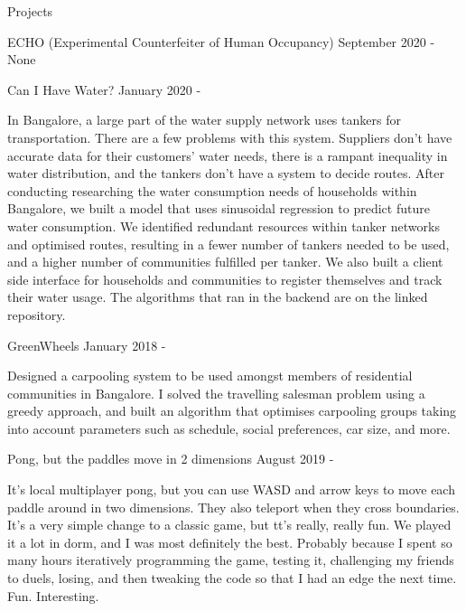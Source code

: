\documentclass{resume} %
\begin{document}
\begin{rSection}{Projects}
\begin{rSubsection}{ ECHO (Experimental Counterfeiter of Human Occupancy) }{ September 2020 - None }{}
\end{rSubsection}



\begin{rSubsection}{ Can I Have Water? }{ January 2020 -  }{}
\item In Bangalore, a large part of the water supply network uses tankers for transportation. There are a few problems with this system. Suppliers don’t have accurate data for their customers’ water needs, there is a rampant inequality in water distribution, and the tankers don't have a system to decide routes. After conducting researching the water consumption needs of households within Bangalore, we built a model that uses sinusoidal regression to predict future water consumption. We identified redundant resources within tanker networks and optimised routes, resulting in a fewer number of tankers needed to be used, and a higher number of communities fulfilled per tanker. We also built a client side interface for households and communities to register themselves and track their water usage. The algorithms that ran in the backend are on the linked repository.

\end{rSubsection}



\begin{rSubsection}{ GreenWheels }{ January 2018 -  }{}
\item Designed a carpooling system to be used amongst members of residential communities in Bangalore. I solved the travelling salesman problem using a greedy approach, and built an algorithm that optimises carpooling groups taking into account parameters such as schedule, social preferences, car size, and more.

\end{rSubsection}



\begin{rSubsection}{ Pong, but the paddles move in 2 dimensions }{ August 2019 -  }{}
\item It's local multiplayer pong, but you can use WASD and arrow keys to move each paddle around in two dimensions. They also teleport when they cross boundaries. It's a very simple change to a classic game, but tt's really, really fun. We played it a lot in dorm, and I was most definitely the best. Probably because I spent so many hours iteratively programming the game, testing it, challenging my friends to duels, losing, and then tweaking the code so that I had an edge the next time. Fun. Interesting.


\end{rSubsection}
\end{rSection}
\end{document}
